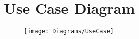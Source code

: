 \section{Use Case Diagram}
\begin{figure}[p]
\centering
\texttt{[image: Diagrams/UseCase]}
\end{figure}